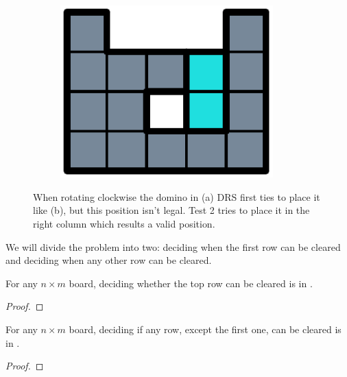 \begin{figure}[ht]
\begin{subfigure}[b]{0.2\textwidth}
    \includegraphics[width=0.9\textwidth]{pictures/dominoes/drs-3.pdf}
    \caption{}
  \end{subfigure}
  \caption{When rotating clockwise the domino in (a) DRS first ties to place it like (b), but this position isn't legal. Test 2 tries to place it in the right column which results a valid position.}
  \label{dom:drs}
\end{figure}


We will divide the problem into two: deciding when the first row can be cleared and deciding when any other row can be cleared.

\begin{lemma0}
For any $n \times m$ board, deciding whether the top row can be cleared is in \pp.
\end{lemma0}
\begin{proof}

\end{proof}

\begin{lemma0}
For any $n \times m$ board, deciding if any row, except the first one, can be cleared is in \pp.
\end{lemma0}

\begin{proof}

\end{proof}
